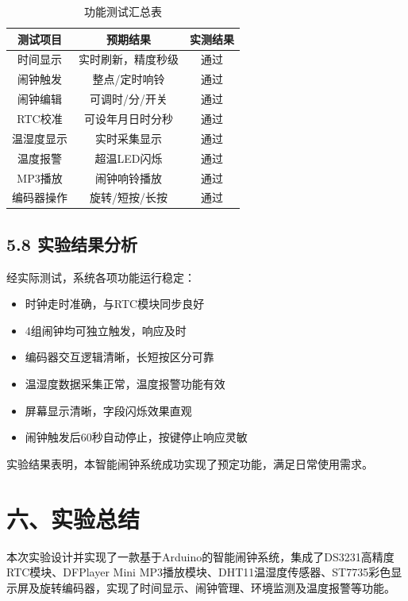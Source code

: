 \documentclass[12pt,a4paper]{article}
\begin{document}
\begin{table}[H]
\centering
\begin{tabular}{|c|c|c|}
\hline
\textbf{测试项目} & \textbf{预期结果} & \textbf{实测结果} \\
\hline
时间显示 & 实时刷新，精度秒级 & 通过 \\
\hline
闹钟触发 & 整点/定时响铃 & 通过 \\
\hline
闹钟编辑 & 可调时/分/开关 & 通过 \\
\hline
RTC校准 & 可设年月日时分秒 & 通过 \\
\hline
温湿度显示 & 实时采集显示 & 通过 \\
\hline
温度报警 & 超温LED闪烁 & 通过 \\
\hline
MP3播放 & 闹钟响铃播放 & 通过 \\
\hline
编码器操作 & 旋转/短按/长按 & 通过 \\
\hline
\end{tabular}
\caption{功能测试汇总表}
\end{table}

\subsection*{5.8 实验结果分析}

经实际测试，系统各项功能运行稳定：

\begin{itemize}
    \item 时钟走时准确，与RTC模块同步良好
    \item 4组闹钟均可独立触发，响应及时
    \item 编码器交互逻辑清晰，长短按区分可靠
    \item 温湿度数据采集正常，温度报警功能有效
    \item 屏幕显示清晰，字段闪烁效果直观
    \item 闹钟触发后60秒自动停止，按键停止响应灵敏
\end{itemize}

实验结果表明，本智能闹钟系统成功实现了预定功能，满足日常使用需求。

\section*{六、实验总结}

本次实验设计并实现了一款基于Arduino的智能闹钟系统，集成了DS3231高精度RTC模块、DFPlayer Mini MP3播放模块、DHT11温湿度传感器、ST7735彩色显示屏及旋转编码器，实现了时间显示、闹钟管理、环境监测及温度报警等功能。
\end{document}

